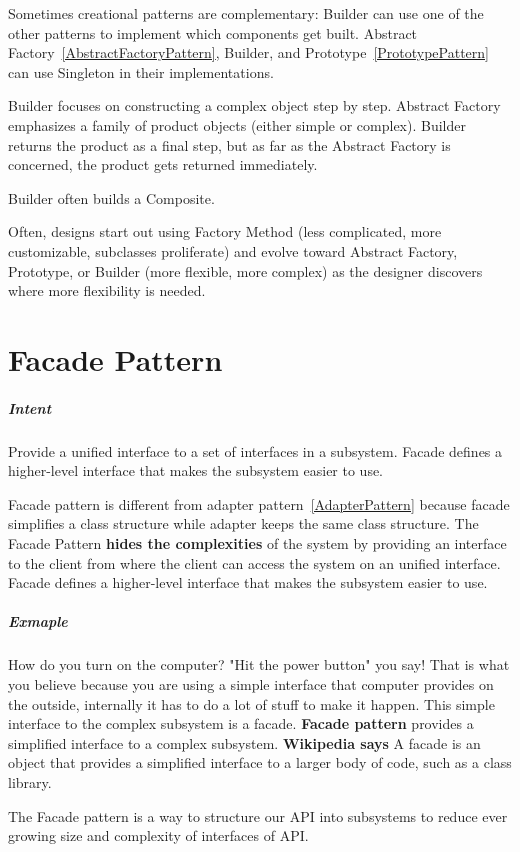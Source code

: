 \documentclass{book}
\newcounter{subpart}
\begin{document}
Sometimes creational patterns are complementary: Builder can use one of the other patterns to implement which components get built.
Abstract Factory~\ref{AbstractFactoryPattern}, Builder, and Prototype~\ref{PrototypePattern} can use Singleton in their implementations.

Builder focuses on constructing a complex object step by step. Abstract Factory emphasizes a family of product objects (either simple or complex).
Builder returns the product as a final step, but as far as the Abstract Factory is concerned, the product gets returned immediately.

Builder often builds a Composite.

Often, designs start out using Factory Method (less complicated, more customizable, subclasses proliferate) and evolve toward Abstract Factory,
Prototype, or Builder (more flexible, more complex) as the designer discovers where more flexibility is needed.


\label{StructuralPattern}
\chapter{Facade Pattern}\label{FacadePattern}

\paragraph{Intent}
Provide a unified interface to a set of interfaces in a subsystem. Facade defines a higher-level interface that makes the subsystem easier to use.

Facade pattern is different from adapter pattern~\ref{AdapterPattern} because facade simplifies a class structure while adapter keeps the same class structure.
The Facade Pattern \textbf{hides the complexities} of the system by providing an interface to the client from where the client can access the system on an unified interface.
Facade defines a higher-level interface that makes the subsystem easier to use.
\paragraph{Exmaple}
How do you turn on the computer? "Hit the power button" you say! That is what you believe because you are using a simple interface that computer provides on the outside,
internally it has to do a lot of stuff to make it happen. This simple interface to the complex subsystem is a facade.
\textbf{Facade pattern} provides a simplified interface to a complex subsystem.
\textbf{Wikipedia says} A facade is an object that provides a simplified interface to a larger body of code, such as a class library.
\begin{figure}[H]
\begin{floatrow}
\end{floatrow}
\end{figure}
The Facade pattern is a way to structure our API into subsystems to reduce ever growing size and complexity of interfaces of API.
\end{document}

